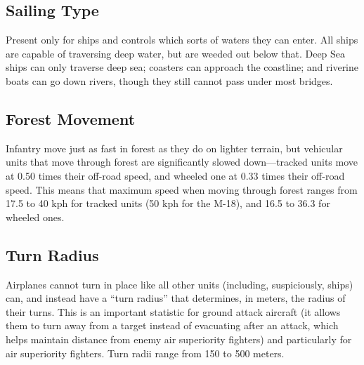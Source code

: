 \documentclass{article}
\begin{document}
\subsection{Sailing Type}

Present only for ships and controls which sorts of waters they can enter. All
ships are capable of traversing deep water, but are weeded out below that. Deep
Sea ships can only traverse deep sea; coasters can approach the coastline; and
riverine boats can go down rivers, though they still cannot pass under most
bridges.


\subsection{Forest Movement}

Infantry move just as fast in forest as they do on lighter terrain, but
vehicular units that move through forest are significantly slowed
down---tracked units move at 0.50 times their off-road speed, and wheeled one at
0.33 times their off-road speed. This means that maximum speed when moving
through forest ranges from 17.5 to 40 kph for tracked units (50 kph for the
M-18), and 16.5 to 36.3 for wheeled ones.

\subsection{Turn Radius}

Airplanes cannot turn in place like all other units (including, suspiciously,
ships) can, and instead have a ``turn radius'' that determines, in meters, the
radius of their turns. This is an important statistic for ground attack aircraft
(it allows them to turn away from a target instead of evacuating after an
attack, which helps maintain distance from enemy air superiority fighters) and
particularly for air superiority fighters. Turn radii range from 150 to 500
meters.
\end{document}
